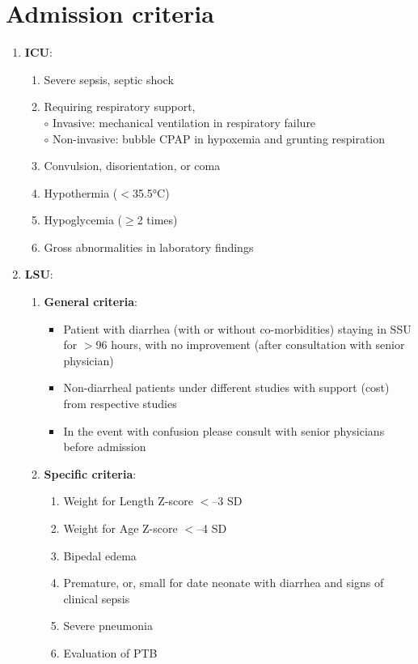\documentclass[11pt,a4paper]{report}
\begin{document}
\section[Admission Criteria]{Admission criteria}
\begin{enumerate}
	\item \textbf{ICU}:
	\begin{enumerate}
		\item Severe sepsis, septic shock 
		\item Requiring respiratory support, \\
		$\circ$ Invasive: mechanical ventilation in respiratory failure \\
		$\circ$ Non-invasive: bubble CPAP in hypoxemia and grunting respiration 
		\item Convulsion, disorientation, or coma
		\item Hypothermia ($<$35.5\si{\celsius})
		\item Hypoglycemia ($\geq$2 times)
		\item Gross abnormalities in laboratory findings
	\end{enumerate}
	\item \textbf{LSU}:
	\begin{enumerate}
		\item \textbf{General criteria}:
		\begin{itemize}
			\item Patient with diarrhea (with or without co-morbidities) staying in SSU for $>$96 hours, with no improvement (after consultation with senior physician)
			\item Non-diarrheal patients under different studies with support (cost) from respective studies 
			\item In the event with confusion please consult with senior physicians before admission
		\end{itemize}
		\item \textbf{Specific criteria}: 
		\begin{enumerate}
			\item Weight for Length Z-score $<$--3 SD
			\item Weight for Age Z-score $<$--4 SD
			\item Bipedal edema 
			\item Premature, or, small for date neonate with diarrhea and signs of clinical sepsis 
			\item Severe pneumonia 
			\item Evaluation of PTB

\end{enumerate}
\end{enumerate}
\end{enumerate}
\end{document}
